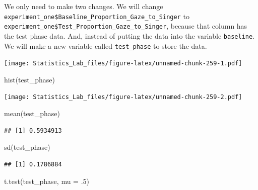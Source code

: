\documentclass[
]{book}
\newenvironment{Shaded}{\begin{snugshade}}{\end{snugshade}}
\newcommand{\AttributeTok}[1]{\textcolor[rgb]{0.77,0.63,0.00}{#1}}
\newcommand{\DecValTok}[1]{\textcolor[rgb]{0.00,0.00,0.81}{#1}}
\newcommand{\FunctionTok}[1]{\textcolor[rgb]{0.00,0.00,0.00}{#1}}
\newcommand{\NormalTok}[1]{#1}
\newcommand{\OtherTok}[1]{\textcolor[rgb]{0.56,0.35,0.01}{#1}}
\newcommand{\SpecialCharTok}[1]{\textcolor[rgb]{0.00,0.00,0.00}{#1}}
\begin{document}
We only need to make two changes. We will change \texttt{experiment\_one\$Baseline\_Proportion\_Gaze\_to\_Singer} to \texttt{experiment\_one\$Test\_Proportion\_Gaze\_to\_Singer}, because that column has the test phase data. And, instead of putting the data into the variable \texttt{baseline}. We will make a new variable called \texttt{test\_phase} to store the data.

\begin{Shaded}
\end{Shaded}

\texttt{[image: Statistics\_Lab\_files/figure-latex/unnamed-chunk-259-1.pdf]}

\begin{Shaded}
\begin{Highlighting}[]
\FunctionTok{hist}\NormalTok{(test\_phase)}
\end{Highlighting}
\end{Shaded}

\texttt{[image: Statistics\_Lab\_files/figure-latex/unnamed-chunk-259-2.pdf]}

\begin{Shaded}
\begin{Highlighting}[]
\FunctionTok{mean}\NormalTok{(test\_phase)}
\end{Highlighting}
\end{Shaded}

\begin{verbatim}
## [1] 0.5934913
\end{verbatim}

\begin{Shaded}
\begin{Highlighting}[]
\FunctionTok{sd}\NormalTok{(test\_phase)}
\end{Highlighting}
\end{Shaded}

\begin{verbatim}
## [1] 0.1786884
\end{verbatim}

\begin{Shaded}
\begin{Highlighting}[]
\FunctionTok{t.test}\NormalTok{(test\_phase, }\AttributeTok{mu =}\NormalTok{ .}\DecValTok{5}\NormalTok{)}
\end{Highlighting}
\end{Shaded}
\end{document}
